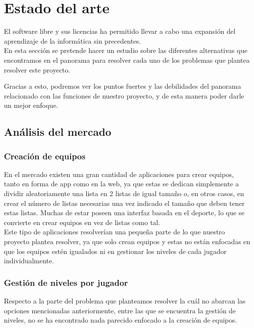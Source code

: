 \chapter{Estado del arte}

El software libre y sus licencias \cite{gplv3} ha permitido llevar a cabo una expansión del
aprendizaje de la informática sin precedentes.\\

En esta sección se pretende hacer un estudio sobre las diferentes alternativas
que encontramos en el panorama para resolver cada uno de los problemas que plantea
resolver este proyecto.

Gracias a esto, podremos ver los puntos fuertes y las debilidades del panorama relacionado
con las funciones de nuestro proyecto, y de esta manera poder darle un mejor enfoque.

\section{Análisis del mercado}

\subsection{Creación de equipos}

En el mercado existen una gran cantidad de aplicaciones para crear equipos, tanto en forma de app como en la web,
ya que estas se dedican simplemente a dividir aleatoriamente una lista en 2 listas de igual tamaño o, en otros casos,
en crear el número de listas necesarias una vez indicado el tamaño que deben tener estas listas.
Muchas de estar poseen una interfaz basada en el deporte, lo que se convierte en crear equipos en vez de listas como tal.\\

Este tipo de aplicaciones resolverían una pequeña parte de lo que nuestro proyecto plantea resolver, ya que solo crean equipos
y estas no están enfocadas en que los equipos estén igualados ni en gestionar los niveles de cada jugador individualmente.

\newpage

\subsection{Gestión de niveles por jugador}

Respecto a la parte del problema que planteamos resolver la cuál no abarcan las opciones mencionadas anteriormente, entre las que
se encuentra la gestión de niveles, no se ha encontrado nada parecido enfocado a la creación de equipos.

